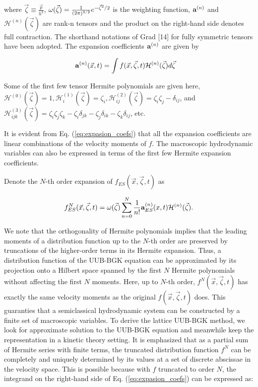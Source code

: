 \documentclass[doublecol]{epl2}
\begin{document}
where $\vec\zeta \equiv \frac{\vec p}{h^3}$, $\omega (\vec\zeta) = {1 \over (2\pi)^{3/2} } e^{-\vec\zeta^2/2}$ is the weighting function, ${\bf a}^{(n)}$ and ${{\mathcal H} }^{(n)} (\vec\zeta )$ are rank-n tensors and the product on the right-hand side denotes full contraction.   The shorthand notations of Grad [14] for fully symmetric tensors have been adopted. The expansion coefficients ${\bf a}^{(n)}$ are given by

\begin{align}
{\bf a}^{(n)} (\vec x,t)&=\int f(\vec x,\vec\zeta ,t) {{\mathcal H}}^{(n)}(\vec\zeta) d\vec\zeta
\label{eq:expasion_coefs}
\end{align}

Some of the first few tensor Hermite polynomials are given here, ${{\mathcal H}}^{(0)} (\vec\zeta ) = 1, {{\mathcal H}} _{i}^{(1)} (\vec\zeta )=\zeta _{i}, {{\mathcal H}}_{ij}^{(2)} (\vec\zeta ) =\zeta _{i} \zeta _{j} - \delta _{ij}$, and ${{\mathcal H}}_{ijk}^{(3)} (\vec\zeta ) =\zeta _{i} \zeta _{j} \zeta _{k}-\zeta _{i}\delta_{jk} -\zeta _{j}\delta _{ik} -\zeta _{k} \delta _{ij}$, etc.

It is evident from Eq. (\ref{eq:expasion_coefs}) that all the expansion coefficients are linear combinations of the velocity moments of $f$.  The macroscopic hydrodynamic variables can also be expressed in terms of the first few Hermite expansion coefficients.

Denote the $N$-th order expansion of $f_{ES}(\vec x,\vec\zeta ,t)$ as

\begin{align}
 f^N_{ES}(\vec x,\vec\zeta ,t) =\omega (\vec\zeta )\sum _{n=0}^N
\frac{1}{n!} {\bf a}^{(n)}_{ES}(x,t) {{\mathcal H}}^{(n)} (\vec\zeta ).
\end{align}

We note that the orthogonality of Hermite polynomials implies that the leading moments of a distribution function up to the $N$-th order are
preserved by truncations of the higher-order terms in its Hermite expansion.  Thus, a distribution function of the UUB-BGK equation can be approximated by its projection onto a Hilbert space spanned by the first $N$ Hermite polynomials without affecting the first $N$ moments.  Here, up to $N$-th order, $f^N(\vec x,\vec\zeta ,t)$ has exactly the same velocity moments as the original $f(\vec x,\vec\zeta ,t)$ does. This guaranties that a semiclassical hydrodynamic system can be constructed by a finite set of macroscopic variables.
To derive the lattice UUB-BGK method, we look for approximate solution to the UUB-BGK equation and meanwhile keep the representation in a kinetic theory setting.  It is emphasized that as a partial sum of Hermite series with finite terms, the truncated distribution function $f^N$ can be completely and uniquely determined by its values at a set of discrete abscissae in the velocity space.  This is possible because with $f$ truncated to order $N$, the integrand on the right-hand side of Eq. (\ref{eq:expasion_coefs}) can be expressed as:
\end{document}

